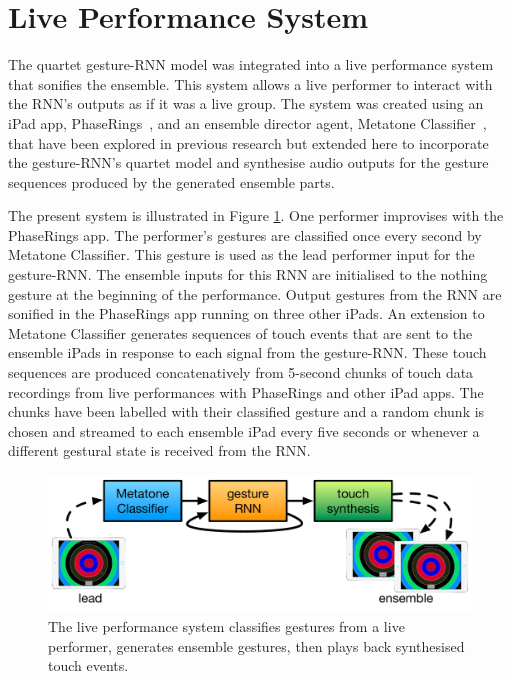 \documentclass[sigchi]{acmart} %
\begin{document}
\section{Live Performance System}

The quartet gesture-RNN model was integrated into a live performance
system that sonifies the ensemble. This system allows a live performer
to interact with the RNN's outputs as if it was a live group.
The system was created using an iPad app,
PhaseRings~\cite{Martin:2016ah}, and an ensemble director agent,
Metatone Classifier~\cite{Martin:2016xu}, that have been explored in
previous research but extended here to incorporate the gesture-RNN's
quartet model and synthesise audio outputs for the gesture sequences
produced by the generated ensemble parts.

The present system is illustrated in Figure
\ref{fig:live-performance-system}. One performer improvises with the
PhaseRings app. The performer's gestures are classified once every
second by Metatone Classifier. This gesture is used as the lead
performer input for the gesture-RNN. The ensemble inputs for this RNN
are initialised to the nothing gesture at the beginning of the
performance. Output gestures from the RNN are sonified in the
PhaseRings app running on three other iPads. An extension to Metatone
Classifier generates sequences of touch events that are sent to the
ensemble iPads in response to each signal from the gesture-RNN. These
touch sequences are produced concatenatively from 5-second chunks of
touch data recordings from live performances with PhaseRings and other
iPad apps. The chunks have been labelled with their classified gesture
and a random chunk is chosen and streamed to each ensemble iPad every
five seconds or whenever a different gestural state is received from
the RNN.

\begin{figure}
  \centering
  \includegraphics[width=\columnwidth]{live-performance-system}
  \caption{The live performance system classifies gestures from a live
  performer, generates ensemble gestures, then plays back synthesised
  touch events.}\label{fig:live-performance-system}
\end{figure}
\end{document}

